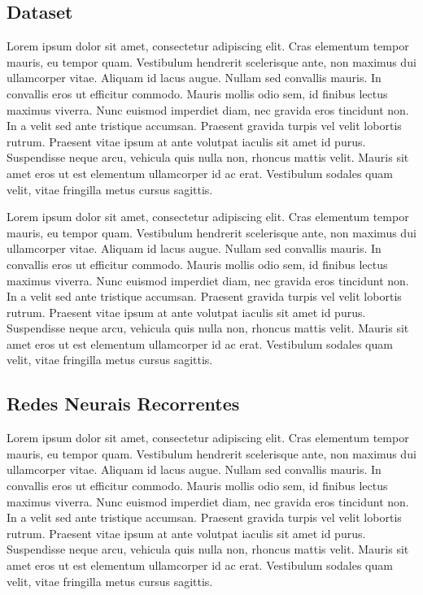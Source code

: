 \documentclass[conference]{IEEEtran}
\begin{document}
\subsection{Dataset}

Lorem ipsum dolor sit amet, consectetur adipiscing elit. Cras elementum tempor mauris, eu tempor quam. Vestibulum hendrerit scelerisque ante, non maximus dui ullamcorper vitae. Aliquam id lacus augue. Nullam sed convallis mauris. In convallis eros ut efficitur commodo. Mauris mollis odio sem, id finibus lectus maximus viverra. Nunc euismod imperdiet diam, nec gravida eros tincidunt non. In a velit sed ante tristique accumsan. Praesent gravida turpis vel velit lobortis rutrum. Praesent vitae ipsum at ante volutpat iaculis sit amet id purus. Suspendisse neque arcu, vehicula quis nulla non, rhoncus mattis velit. Mauris sit amet eros ut est elementum ullamcorper id ac erat. Vestibulum sodales quam velit, vitae fringilla metus cursus sagittis.

Lorem ipsum dolor sit amet, consectetur adipiscing elit. Cras elementum tempor mauris, eu tempor quam. Vestibulum hendrerit scelerisque ante, non maximus dui ullamcorper vitae. Aliquam id lacus augue. Nullam sed convallis mauris. In convallis eros ut efficitur commodo. Mauris mollis odio sem, id finibus lectus maximus viverra. Nunc euismod imperdiet diam, nec gravida eros tincidunt non. In a velit sed ante tristique accumsan. Praesent gravida turpis vel velit lobortis rutrum. Praesent vitae ipsum at ante volutpat iaculis sit amet id purus. Suspendisse neque arcu, vehicula quis nulla non, rhoncus mattis velit. Mauris sit amet eros ut est elementum ullamcorper id ac erat. Vestibulum sodales quam velit, vitae fringilla metus cursus sagittis.

\subsection{Redes Neurais Recorrentes}
Lorem ipsum dolor sit amet, consectetur adipiscing elit. Cras elementum tempor mauris, eu tempor quam. Vestibulum hendrerit scelerisque ante, non maximus dui ullamcorper vitae. Aliquam id lacus augue. Nullam sed convallis mauris. In convallis eros ut efficitur commodo. Mauris mollis odio sem, id finibus lectus maximus viverra. Nunc euismod imperdiet diam, nec gravida eros tincidunt non. In a velit sed ante tristique accumsan. Praesent gravida turpis vel velit lobortis rutrum. Praesent vitae ipsum at ante volutpat iaculis sit amet id purus. Suspendisse neque arcu, vehicula quis nulla non, rhoncus mattis velit. Mauris sit amet eros ut est elementum ullamcorper id ac erat. Vestibulum sodales quam velit, vitae fringilla metus cursus sagittis.
\end{document}
